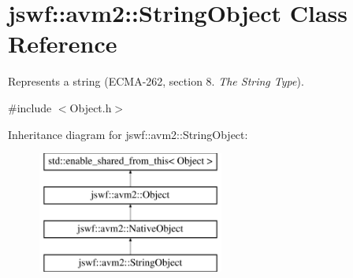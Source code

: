 \hypertarget{classjswf_1_1avm2_1_1_string_object}{\section{jswf\+:\+:avm2\+:\+:String\+Object Class Reference}
\label{classjswf_1_1avm2_1_1_string_object}
}


Represents a string (E\+C\+M\+A-\/262, section 8. {\itshape The String Type}).  




{\ttfamily \#include $<$Object.\+h$>$}

Inheritance diagram for jswf\+:\+:avm2\+:\+:String\+Object\+:\begin{figure}[H]
\begin{center}
\leavevmode
\includegraphics[height=4.000000cm]{classjswf_1_1avm2_1_1_string_object}
\end{center}
\end{figure}
